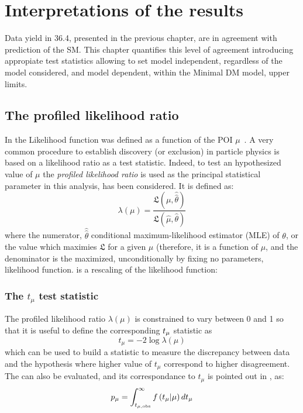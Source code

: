 \chapter{Interpretations of the results}

\lettrine{D}{}ata yield in \SI{36.4}{\ifb}, presented in the previous chapter, are in agreement with prediction of the SM. This chapter quantifies this level of agreement introducing appropiate test statistics allowing to set model independent, regardless of the model considered, and model dependent, within the Minimal DM model, upper limits.

\section{The profiled likelihood ratio}
In \Sect{\ref{sec:likelihood}} the Likelihood function was defined as a function of the POI $\mu$~\cite{Cowan}.
A very common procedure to establish discovery (or exclusion) in particle physics is based on a likelihood ratio as a test statistic. Indeed, to test an hypothesized value of $\mu$ the \emph{profiled likelihood ratio} is used as the principal statistical parameter in this analysis, has been considered. It is defined as:
\begin{equation}
  \lambda(\mu) = \frac {\mathfrak{L}(\mu,\hat{\hat{\theta}})}{\mathfrak{L(\hat{\mu},\hat{\theta})}}
  \label{eqn:profiled}
\end{equation}
where the numerator, $\hat{\hat{\theta}}$ conditional maximum-likelihood estimator (MLE) of $\theta$, or the value which maximies $\mathfrak{L}$ for a given $\mu$ (therefore, it is a function of $\mu$, and the denominator is the maximized, unconditionally by fixing no parameters, likelihood function. \Eqn{\ref{eqn:profiled}} is a rescaling of the likelihood function: 

\subsection{The $t_\mu$ test statistic}
The profiled likelihood ratio $\lambda(\mu)$ is constrained to vary between 0 and 1 so that it is useful to define the corresponding $t_{\mu}$ statistic as 
\begin{equation}
  t_{\mu} = -2 \log{\lambda(\mu)}
\end{equation}
which can be used to build a statistic to measure the discrepancy between data and the hypothesis where higher value of $t_{\mu}$ correspond to higher disagreement. The \p can also be evaluated, and its correspondance to $t_{\mu}$ is pointed out in \Fig{\ref{pvalue}}, as:
\begin{equation}
 p_{\mu}=\int_{t_{\mu,\textup{obs}}}^\infty f\left(t_\mu \vert \mu\right) dt_\mu
 \label{eqn:pdatmu}
\end{equation}

